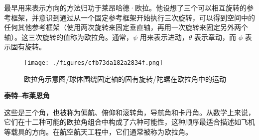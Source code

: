 最早用来表示方向的方法归功于莱昂哈德·欧拉。他设想了三个可以相互旋转的参考框架，并意识到通过从一个固定参考框架开始执行三次旋转，可以得到空间中的任何其他参考框架（使用两次旋转来固定垂直轴，再用一次旋转来固定另外两个轴）。这三次旋转的值称为欧拉角。通常，\(\psi\) 用来表示进动，\(\theta\) 表示章动，而 \(\phi\) 表示固有旋转。
\begin{figure}[ht]
\centering
\texttt{[image: ./figures/cfb73da182a2834f.png]}
\caption{欧拉角示意图/球体围绕固定轴的固有旋转/陀螺在欧拉角中的运动} \label{fig_GTDL_3}
\end{figure}
\textbf{泰特–布莱恩角}

这些是三个角，也被称为偏航、俯仰和滚转角，导航角和卡丹角。从数学上来说，它们在十二种可能的欧拉角组合中构成了六种可能性，这种顺序最适合描述如飞机等载具的方向。在航空航天工程中，它们通常被称为欧拉角。